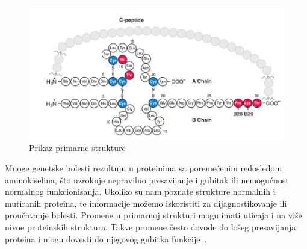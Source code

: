 \begin{figure}[h]
	\centering
    \includegraphics[width=1\textwidth]{Figures/BO/insulin.png}
    \caption{Prikaz primarne strukture~\cite{bmbg}}
    \label{fig:insulin}
\end{figure}

Mnoge genetske bolesti rezultuju u proteinima sa poremećenim redosledom aminokiselina, što uzrokuje nepravilno presavijanje i gubitak ili nemogućnost normalnog funkcionisanja. Ukoliko su nam poznate strukture normalnih i mutiranih proteina, te informacije možemo iskoristiti za dijagnostikovanje ili proučavanje bolesti. Promene u primarnoj strukturi mogu imati uticaja i na više nivoe proteinskih struktura. Takve promene često dovode do lošeg presavijanja proteina i mogu dovesti do njegovog gubitka funkcije~\cite{flash,lippincott}.


